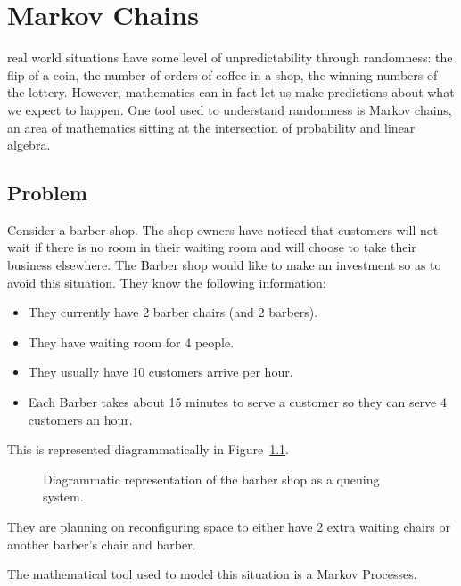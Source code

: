 \chapter[Markov Chains]{Markov Chains}

 real world situations have some level of
unpredictability through randomness: the flip of a coin, the number of orders of
coffee in a shop, the winning numbers of the lottery. However, mathematics can
in fact let us make predictions about what we expect to happen. One tool used to
understand randomness is Markov chains, an area of mathematics sitting at the
intersection of probability and linear algebra.

\section{Problem}\label{sec:problem}

Consider a barber shop. The shop owners have noticed that customers will not
wait if there is no room in their waiting room and will choose to take their
business elsewhere. The Barber shop would like to make an investment so as to
avoid this situation. They know the following information:

\begin{itemize}
    \item They currently have 2 barber chairs (and 2 barbers).
    \item They have waiting room for 4 people.
    \item They usually have 10 customers arrive per hour.
    \item Each Barber takes about 15 minutes to serve a customer so they can
        serve 4 customers an hour.
\end{itemize}

This is represented diagrammatically in Figure~\ref{fig:barber-shop}.

\begin{figure}[!hbtp]
    
    \caption{Diagrammatic representation of the barber shop as a queuing system.}
    \label{fig:barber-shop}
\end{figure}


They are planning on
reconfiguring space to either have 2 extra waiting chairs or
another barber's chair and barber.

The mathematical tool used to model this situation is a Markov Processes.

